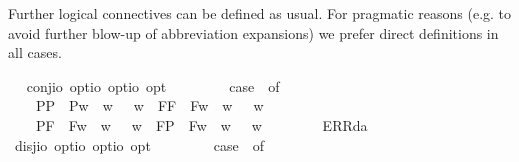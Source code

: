 \begin{isabellebody}
\isamarkuptrue%
%
\begin{isamarkuptext}%
Further logical connectives can be defined as usual. For pragmatic reasons (e.g. to avoid further blow-up of
  abbreviation expansions) we prefer direct definitions in all cases.%
\end{isamarkuptext}\isamarkuptrue%
\ \isamarkupfalse%
\ conj{\isacharcolon}{\isacharcolon}{\isachardoublequoteopen}io\ opt{\isasymRightarrow}io\ opt{\isasymRightarrow}io\ opt{\isachardoublequoteclose}\ {\isacharparenleft}\ {\isachardoublequoteopen}\isactrlbold {\isasymand}{\isachardoublequoteclose}\ {}{}{\isacharparenright}\ \ {\isachardoublequoteopen}{\isasymphi}\ \isactrlbold {\isasymand}\ {\isasympsi}\ {\isasymequiv}\ case\ {\isacharparenleft}{\isasymphi}{\isacharcomma}{\isasympsi}{\isacharparenright}\ of\isanewline
\ \ \ \ {\isacharparenleft}P{\isacharparenleft}{\isasymalpha}{\isacharparenright}{\isacharcomma}P{\isacharparenleft}{\isasymbeta}{\isacharparenright}{\isacharparenright}\ {\isasymRightarrow}\ P{\isacharparenleft}{\isasymlambda}w{\isachardot}\ {\isasymalpha}\ w\ {\isasymand}\ {\isasymbeta}\ w{\isacharparenright}\ {\isacharbar}\ {\isacharparenleft}F{\isacharparenleft}{\isasymalpha}{\isacharparenright}{\isacharcomma}F{\isacharparenleft}{\isasymbeta}{\isacharparenright}{\isacharparenright}\ {\isasymRightarrow}\ F{\isacharparenleft}{\isasymlambda}w{\isachardot}\ {\isasymalpha}\ w\ {\isasymand}\ {\isasymbeta}\ w{\isacharparenright}\ {\isacharbar}\ \isanewline
\ \ \ \ {\isacharparenleft}P{\isacharparenleft}{\isasymalpha}{\isacharparenright}{\isacharcomma}F{\isacharparenleft}{\isasymbeta}{\isacharparenright}{\isacharparenright}\ {\isasymRightarrow}\ F{\isacharparenleft}{\isasymlambda}w{\isachardot}\ {\isasymalpha}\ w\ {\isasymand}\ {\isasymbeta}\ w{\isacharparenright}\ {\isacharbar}\ {\isacharparenleft}F{\isacharparenleft}{\isasymalpha}{\isacharparenright}{\isacharcomma}P{\isacharparenleft}{\isasymbeta}{\isacharparenright}{\isacharparenright}\ {\isasymRightarrow}\ F{\isacharparenleft}{\isasymlambda}w{\isachardot}\ {\isasymalpha}\ w\ {\isasymand}\ {\isasymbeta}\ w{\isacharparenright}\ {\isacharbar}\ \isanewline
\ \ \ \ {\isacharunderscore}\ {\isasymRightarrow}\ ERR{\isacharparenleft}da{\isacharparenright}{\isachardoublequoteclose}\ \ \isanewline
\isanewline
\ \isamarkupfalse%
\ disj{\isacharcolon}{\isacharcolon}{\isachardoublequoteopen}io\ opt{\isasymRightarrow}io\ opt{\isasymRightarrow}io\ opt{\isachardoublequoteclose}\ {\isacharparenleft}\ {\isachardoublequoteopen}\isactrlbold {\isasymor}{\isachardoublequoteclose}\ {}{}{\isacharparenright}\ \ {\isachardoublequoteopen}{\isasymphi}\ \isactrlbold {\isasymor}\ {\isasympsi}\ {\isasymequiv}\ case\ {\isacharparenleft}{\isasymphi}{\isacharcomma}{\isasympsi}{\isacharparenright}\ of\isanewline

\end{isabellebody}
